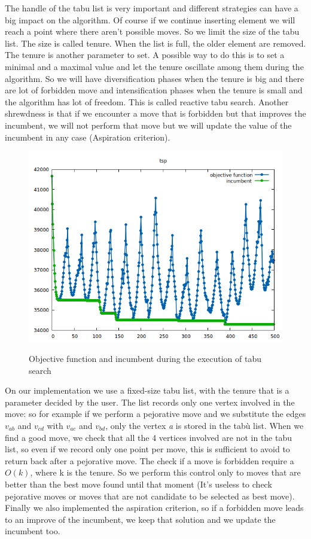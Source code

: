 \noindent The handle of the tabu list is very important and different strategies can have a big impact on the algorithm. Of course if we continue inserting element we will reach a point where there aren't possible moves. So we limit the size of the tabu list. The size is called tenure. When the list is full, the older element are removed.
The tenure is another parameter to set. A possible way to do this is to set a minimal and a maximal value and let the tenure oscillate among them during the algorithm. So we will have diversification phases when the tenure is big and there are lot of forbidden move and intensification phases when the tenure is small and the algorithm has lot of freedom. This is called reactive tabu search.
Another shrewdness is that if we encounter a move that is forbidden but that improves the incumbent, we will not perform that move but we will update the value of the incumbent in any case (Aspiration criterion).\\

\begin{figure}[h!]
\centering
	\includegraphics[scale=0.6]{media/tabuSearch1.png} \\
	\caption{Objective function and incumbent during the execution of tabu search}
\end{figure}

\noindent On our implementation we use a fixed-size tabu list, with the tenure that is a parameter decided by the user. The list records only one vertex involved in the move: so for example if we perform a pejorative move and we substitute the edges $v_{ab}$ and $v_{cd}$ with $v_{ac}$ and $v_{bd}$, only the vertex \textit{a} is stored in the tabù list. When we find a good move, we check that all the 4 vertices involved are not in the tabu list, so even if we record only one point per move, this is sufficient to avoid to return back after a pejorative move. 
The check if a move is forbidden require a $O(k)$, where k is the tenure. So we perform this control only to moves that are better than the best move found until that moment (It's useless to check pejorative moves or moves that are not candidate to be selected as best move). \\
Finally we also implemented the aspiration criterion, so if a forbidden move leads to an improve of the incumbent, we keep that solution and we update the incumbent too.


